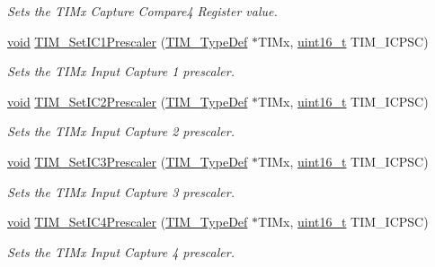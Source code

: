 \begin{DoxyCompactItemize}
\begin{DoxyCompactList}\small\item\em Sets the T\+I\+Mx Capture Compare4 Register value. \end{DoxyCompactList}\item 
\hyperlink{usb__devapi_8h_afabf60e7f57651d6d595a02c75f07cd0}{void} \hyperlink{group___t_i_m___exported___functions_gaf0f684dea88e222de9689d8ed0ca8805}{T\+I\+M\+\_\+\+Set\+I\+C1\+Prescaler} (\hyperlink{struct_t_i_m___type_def}{T\+I\+M\+\_\+\+Type\+Def} $\ast$T\+I\+Mx, \hyperlink{_p_e___types_8h_a1f1825b69244eb3ad2c7165ddc99c956}{uint16\+\_\+t} T\+I\+M\+\_\+\+I\+C\+P\+SC)
\begin{DoxyCompactList}\small\item\em Sets the T\+I\+Mx Input Capture 1 prescaler. \end{DoxyCompactList}\item 
\hyperlink{usb__devapi_8h_afabf60e7f57651d6d595a02c75f07cd0}{void} \hyperlink{group___t_i_m___exported___functions_ga3cc4869b5fe73271808512c89322a325}{T\+I\+M\+\_\+\+Set\+I\+C2\+Prescaler} (\hyperlink{struct_t_i_m___type_def}{T\+I\+M\+\_\+\+Type\+Def} $\ast$T\+I\+Mx, \hyperlink{_p_e___types_8h_a1f1825b69244eb3ad2c7165ddc99c956}{uint16\+\_\+t} T\+I\+M\+\_\+\+I\+C\+P\+SC)
\begin{DoxyCompactList}\small\item\em Sets the T\+I\+Mx Input Capture 2 prescaler. \end{DoxyCompactList}\item 
\hyperlink{usb__devapi_8h_afabf60e7f57651d6d595a02c75f07cd0}{void} \hyperlink{group___t_i_m___exported___functions_ga76f906383b8132ebe00dffadb70cf7f9}{T\+I\+M\+\_\+\+Set\+I\+C3\+Prescaler} (\hyperlink{struct_t_i_m___type_def}{T\+I\+M\+\_\+\+Type\+Def} $\ast$T\+I\+Mx, \hyperlink{_p_e___types_8h_a1f1825b69244eb3ad2c7165ddc99c956}{uint16\+\_\+t} T\+I\+M\+\_\+\+I\+C\+P\+SC)
\begin{DoxyCompactList}\small\item\em Sets the T\+I\+Mx Input Capture 3 prescaler. \end{DoxyCompactList}\item 
\hyperlink{usb__devapi_8h_afabf60e7f57651d6d595a02c75f07cd0}{void} \hyperlink{group___t_i_m___exported___functions_ga0f2c784271356d6b64b8c0da64dbdbc2}{T\+I\+M\+\_\+\+Set\+I\+C4\+Prescaler} (\hyperlink{struct_t_i_m___type_def}{T\+I\+M\+\_\+\+Type\+Def} $\ast$T\+I\+Mx, \hyperlink{_p_e___types_8h_a1f1825b69244eb3ad2c7165ddc99c956}{uint16\+\_\+t} T\+I\+M\+\_\+\+I\+C\+P\+SC)
\begin{DoxyCompactList}\small\item\em Sets the T\+I\+Mx Input Capture 4 prescaler. \end{DoxyCompactList}\item 

\end{DoxyCompactItemize}
